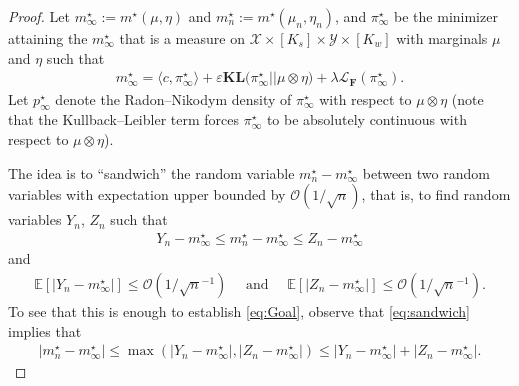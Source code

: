 \documentclass{article}
\newcommand{\kl}{\mathbf{KL}}
\theoremstyle{definition}
\begin{document}
\begin{proof}
Let $m^\star_\infty:=m^\star(\mu,\eta)$ and $m^\star_n:=m^\star(\mu_n,\eta_n)$, and $\pi_\infty^\star$ be the minimizer attaining the $m^\star_\infty$ that is a measure on $\mathcal{X}\times [K_s] \times \mathcal{Y}\times [K_w]$ with marginals $\mu$ and $\eta$ such that 
\begin{align*}
    m_\infty^\star= \langle c,\pi^\star_\infty
\rangle +\varepsilon\kl\big(\pi^\star_\infty||\mu\otimes \eta\big)+ \lambda\mathcal{L}_\mathbf{F}(\pi^\star_\infty).
\end{align*}
Let $p^\star_\infty$ denote the Radon–Nikodym density of $\pi^\star_\infty$ with respect to $\mu \otimes \eta$ (note that the Kullback–Leibler term forces $\pi^\star_\infty$ to be absolutely continuous with respect to $\mu\otimes \eta$).

The idea is to ``sandwich'' the random variable $m_n^\star -m^\star_\infty$ between two random variables with expectation upper bounded by $\mathcal{O}(1/\sqrt{n})$, that is, to find random variables $Y_n$, $Z_n$ such that 
\begin{align}\label{eq:sandwich}
    Y_n- m_\infty^\star\leq m_n^\star-m_\infty^\star\leq Z_n-m_\infty^\star
\end{align}
and 
\begin{align*}
\mathbb{E}[|Y_n-m_\infty^\star|]\leq \mathcal{O}(1/\sqrt{n}^{-1}) \quad \text{ and } \quad \mathbb{E}[|Z_n-m_\infty^\star|]\leq \mathcal{O}(1/\sqrt{n}^{-1}).
\end{align*}
To see that this is enough to establish \eqref{eq:Goal}, observe that \eqref{eq:sandwich} implies that 
\begin{align*}
    |m_n^\star-m_\infty^\star|\leq \max(|Y_n-m_\infty^\star|,|Z_n-m_\infty^\star|)\leq |Y_n-m_\infty^\star|+|Z_n-m_\infty^\star|.
\end{align*}

\end{proof}
\end{document}
